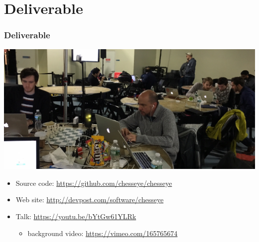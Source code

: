 \documentclass[t]{beamer}
\begin{document}
\section{Deliverable}

\begin{frame}[fragile]
\frametitle{Deliverable}

\begin{center}
  \includegraphics[scale=0.15]{figures/photo-deliverable}
\end{center}

\begin{itemize}
\item Source code: \url{https://github.com/chesseye/chesseye}
  \medskip
\item Web site: \url{http://devpost.com/software/chesseye}
  \medskip
\item Talk: \url{https://youtu.be/bYtGw61YLRk}
  \begin{itemize}
  \item background video: \url{https://vimeo.com/165765674}
  \end{itemize}
\end{itemize}


\end{frame}

\end{document}
